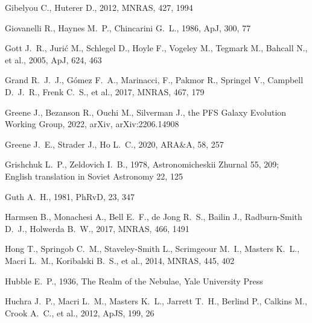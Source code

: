 \documentclass[fleqn,usenatbib]{mnras}
\begin{document}
\begin{thebibliography}{}
 Gibelyou C., Huterer D., 2012, MNRAS, 427, 1994

 Giovanelli R., Haynes M.~P., Chincarini G.~L., 1986, ApJ, 300, 77

 Gott J.~R., Juri{\'c} M., Schlegel D., Hoyle F., Vogeley M., Tegmark M., Bahcall N., et al., 2005, ApJ, 624, 463

 Grand R.~J.~J., G{\'o}mez F.~A., Marinacci, F., Pakmor R., Springel V., Campbell D.~J.~R., Frenk C.~S., et al., 2017, MNRAS, 467, 179

 Greene J., Bezanson R., Ouchi M., Silverman J., the PFS Galaxy Evolution Working Group, 2022, arXiv, arXiv:2206.14908

 Greene J.~E., Strader J., Ho L.~C., 2020, ARA\&A, 58, 257

 Grishchuk L.~P., Zeldovich I.~B., 1978, Astronomicheskii Zhurnal 55, 209; English translation in Soviet Astronomy 22, 125

 Guth A.~H., 1981, PhRvD, 23, 347

 Harmsen B., Monachesi A., Bell E.~F., de Jong R.~S., Bailin J., Radburn-Smith D.~J., Holwerda B.~W., 2017, MNRAS, 466, 1491

 Hong T., Springob C.~M., Staveley-Smith L., Scrimgeour M.~I., Masters K.~L., Macri L.~M., Koribalski B.~S., et al., 2014, MNRAS, 445, 402


 Hubble E.~P., 1936, The Realm of the Nebulae, Yale University Press

 Huchra J.~P., Macri L.~M., Masters K.~L., Jarrett T.~H., Berlind P., Calkins M., Crook A.~C., et al., 2012, ApJS, 199, 26


\end{thebibliography}
\end{document}
